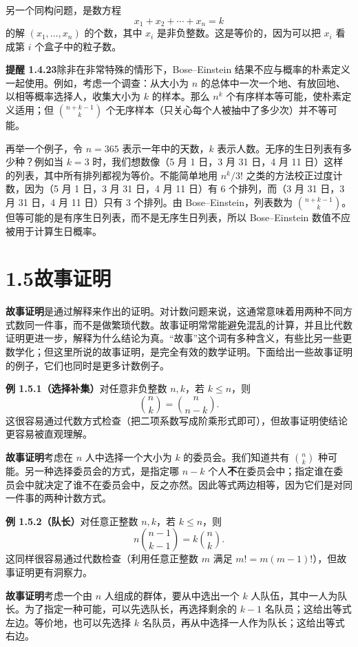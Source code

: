 \documentclass[UTF8, 12pt, fontset=fandol, oneside]{ctexart}
\begin{document}
另一个同构问题，是数方程
\[
  x_1+x_2+\cdots+x_n=k
\]
的解 $(x_1,\ldots,x_n)$ 的个数，其中 $x_i$ 是非负整数。这是等价的，因为可以把 $x_i$ 看成第 $i$ 个盒子中的粒子数。

\noindent\textbf{提醒 1.4.23}\quad 除非在非常特殊的情形下，Bose--Einstein 结果不应与概率的朴素定义一起使用。例如，考虑一个调查：从大小为 $n$ 的总体中一次一个地、有放回地、以相等概率选择人，收集大小为 $k$ 的样本。那么 $n^k$ 个有序样本等可能，使朴素定义适用；但 $\binom{n+k-1}{k}$ 个无序样本（只关心每个人被抽中了多少次）并不等可能。

再举一个例子，令 $n=365$ 表示一年中的天数，$k$ 表示人数。无序的生日列表有多少种？例如当 $k=3$ 时，我们想数像（5 月 1 日，3 月 31 日，4 月 11 日）这样的列表，其中所有排列都视为等价。不能简单地用 $n^k/3!$ 之类的方法校正过度计数，因为（5 月 1 日，3 月 31 日，4 月 11 日）有 6 个排列，而（3 月 31 日，3 月 31 日，4 月 11 日）只有 3 个排列。由 Bose--Einstein，列表数为 $\binom{n+k-1}{k}$。但等可能的是有序生日列表，而不是无序生日列表，所以 Bose--Einstein 数值不应被用于计算生日概率。

\section*{1.5\quad 故事证明}

\textbf{故事证明}是通过解释来作出的证明。对计数问题来说，这通常意味着用两种不同方式数同一件事，而不是做繁琐代数。故事证明常常能避免混乱的计算，并且比代数证明更进一步，解释为什么结论为真。“故事”这个词有多种含义，有些比另一些更数学化；但这里所说的故事证明，是完全有效的数学证明。下面给出一些故事证明的例子，它们也同时是更多计数例子。

\noindent\textbf{例 1.5.1（选择补集）}\quad 对任意非负整数 $n,k$，若 $k\le n$，则
\[
  \binom{n}{k}=\binom{n}{n-k}.
\]
这很容易通过代数方式检查（把二项系数写成阶乘形式即可），但故事证明使结论更容易被直观理解。

\noindent\textbf{故事证明}\quad 考虑在 $n$ 人中选择一个大小为 $k$ 的委员会。我们知道共有 $\binom{n}{k}$ 种可能。另一种选择委员会的方式，是指定哪 $n-k$ 个人\textbf{不}在委员会中；指定谁在委员会中就决定了谁不在委员会中，反之亦然。因此等式两边相等，因为它们是对同一件事的两种计数方式。

\noindent\textbf{例 1.5.2（队长）}\quad 对任意正整数 $n,k$，若 $k\le n$，则
\[
  n\binom{n-1}{k-1}=k\binom{n}{k}.
\]
这同样很容易通过代数检查（利用任意正整数 $m$ 满足 $m!=m(m-1)!$），但故事证明更有洞察力。

\noindent\textbf{故事证明}\quad 考虑一个由 $n$ 人组成的群体，要从中选出一个 $k$ 人队伍，其中一人为队长。为了指定一种可能，可以先选队长，再选择剩余的 $k-1$ 名队员；这给出等式左边。等价地，也可以先选择 $k$ 名队员，再从中选择一人作为队长；这给出等式右边。
\end{document}
